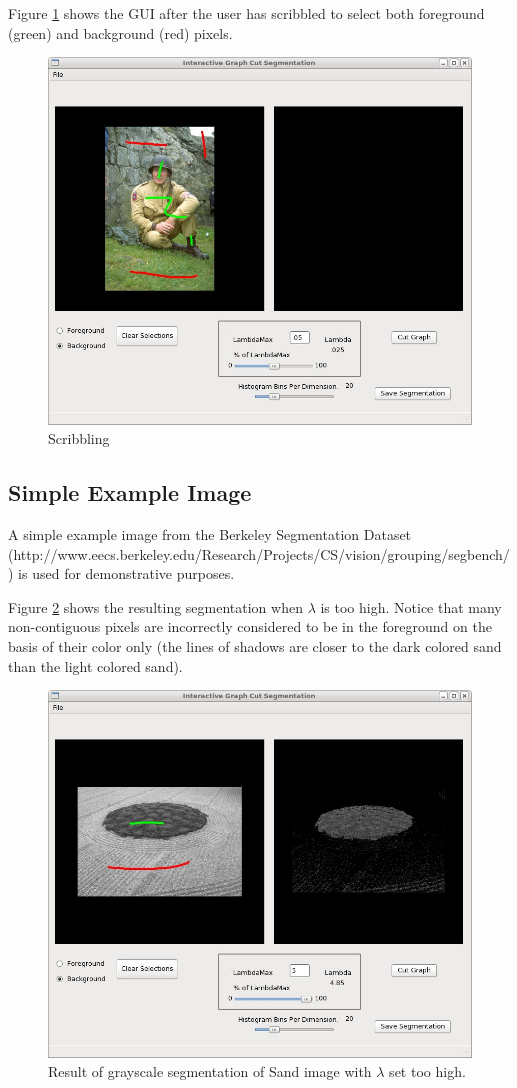 \documentclass{InsightArticle}
\begin{document}
Figure \ref{fig:Scribbling} shows the GUI after the user has scribbled to select both foreground (green) and background (red) pixels.

\begin{center}
	\begin{figure}[H]
  \centering
		\includegraphics[width=0.6\linewidth]{images/Scribbling}
		\caption{Scribbling}
		\label{fig:Scribbling}
	\end{figure}
\end{center} 

\subsection{Simple Example Image}
A simple example image from the Berkeley Segmentation Dataset (http://www.eecs.berkeley.edu/Research/Projects/CS/vision/grouping/segbench/) is used for demonstrative purposes.

Figure \ref{fig:HighLambda} shows the resulting segmentation when $\lambda$ is too high. Notice that many non-contiguous pixels are incorrectly considered to be in the foreground on the basis of their color only (the lines of shadows are closer to the dark colored sand than the light colored sand).

\begin{center}
	\begin{figure}[H]
  \centering
		\includegraphics[width=0.6\linewidth]{images/HighLambda}
		\caption{Result of grayscale segmentation of Sand image with $\lambda$ set too high.}
		\label{fig:HighLambda}
	\end{figure}
\end{center} 
\end{document}
